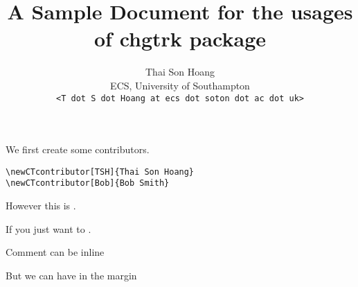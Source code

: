 \usepackage{verbatim}
\title{A Sample Document for the usages of \textsf{chgtrk} package}
\author{Thai Son Hoang\\ECS, University of Southampton\\\texttt{<T dot S dot Hoang at ecs dot soton dot ac dot uk>}}


\maketitle

We first create some contributors.
\begin{verbatim}
\newCTcontributor[TSH]{Thai Son Hoang}
\newCTcontributor[Bob]{Bob Smith}
\end{verbatim}


However this is .

If you just want to .

Comment can be inline

But we can have  in the margin



